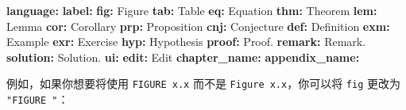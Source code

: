 \documentclass[
  12pt,
]{krantz}
\newenvironment{Shaded}{\begin{snugshade}}{\end{snugshade}}
\newcommand{\AttributeTok}[1]{\textcolor[rgb]{0.13,0.29,0.53}{#1}}
\newcommand{\FunctionTok}[1]{\textcolor[rgb]{0.13,0.29,0.53}{\textbf{#1}}}
\newcommand{\KeywordTok}[1]{\textcolor[rgb]{0.13,0.29,0.53}{\textbf{#1}}}
\newcommand{\StringTok}[1]{\textcolor[rgb]{0.31,0.60,0.02}{#1}}
\theoremstyle{definition}
\theoremstyle{definition}
\theoremstyle{definition}
\theoremstyle{definition}
\theoremstyle{remark}
\begin{document}
\begin{Shaded}
\begin{Highlighting}[]
\FunctionTok{language}\KeywordTok{:}
\AttributeTok{  }\FunctionTok{label}\KeywordTok{:}
\AttributeTok{    }\FunctionTok{fig}\KeywordTok{:}\AttributeTok{ }\StringTok{\textquotesingle{}Figure \textquotesingle{}}
\AttributeTok{    }\FunctionTok{tab}\KeywordTok{:}\AttributeTok{ }\StringTok{\textquotesingle{}Table \textquotesingle{}}
\AttributeTok{    }\FunctionTok{eq}\KeywordTok{:}\AttributeTok{ }\StringTok{\textquotesingle{}Equation \textquotesingle{}}
\AttributeTok{    }\FunctionTok{thm}\KeywordTok{:}\AttributeTok{ }\StringTok{\textquotesingle{}Theorem \textquotesingle{}}
\AttributeTok{    }\FunctionTok{lem}\KeywordTok{:}\AttributeTok{ }\StringTok{\textquotesingle{}Lemma \textquotesingle{}}
\AttributeTok{    }\FunctionTok{cor}\KeywordTok{:}\AttributeTok{ }\StringTok{\textquotesingle{}Corollary \textquotesingle{}}
\AttributeTok{    }\FunctionTok{prp}\KeywordTok{:}\AttributeTok{ }\StringTok{\textquotesingle{}Proposition \textquotesingle{}}
\AttributeTok{    }\FunctionTok{cnj}\KeywordTok{:}\AttributeTok{ }\StringTok{\textquotesingle{}Conjecture \textquotesingle{}}
\AttributeTok{    }\FunctionTok{def}\KeywordTok{:}\AttributeTok{ }\StringTok{\textquotesingle{}Definition \textquotesingle{}}
\AttributeTok{    }\FunctionTok{exm}\KeywordTok{:}\AttributeTok{ }\StringTok{\textquotesingle{}Example \textquotesingle{}}
\AttributeTok{    }\FunctionTok{exr}\KeywordTok{:}\AttributeTok{ }\StringTok{\textquotesingle{}Exercise \textquotesingle{}}
\AttributeTok{    }\FunctionTok{hyp}\KeywordTok{:}\AttributeTok{ }\StringTok{\textquotesingle{}Hypothesis \textquotesingle{}}
\AttributeTok{    }\FunctionTok{proof}\KeywordTok{:}\AttributeTok{ }\StringTok{\textquotesingle{}Proof. \textquotesingle{}}
\AttributeTok{    }\FunctionTok{remark}\KeywordTok{:}\AttributeTok{ }\StringTok{\textquotesingle{}Remark. \textquotesingle{}}
\AttributeTok{    }\FunctionTok{solution}\KeywordTok{:}\AttributeTok{ }\StringTok{\textquotesingle{}Solution. \textquotesingle{}}
\AttributeTok{  }\FunctionTok{ui}\KeywordTok{:}
\AttributeTok{    }\FunctionTok{edit}\KeywordTok{:}\AttributeTok{ Edit}
\AttributeTok{    }\FunctionTok{chapter\_name}\KeywordTok{:}\AttributeTok{ }\StringTok{\textquotesingle{}\textquotesingle{}}
\AttributeTok{    }\FunctionTok{appendix\_name}\KeywordTok{:}\AttributeTok{ }\StringTok{\textquotesingle{}\textquotesingle{}}
\end{Highlighting}
\end{Shaded}

例如，如果你想要将使用 \texttt{FIGURE\ x.x} 而不是 \texttt{Figure\ x.x}，你可以将 \texttt{fig} 更改为 \texttt{"FIGURE\ "}：
\end{document}
